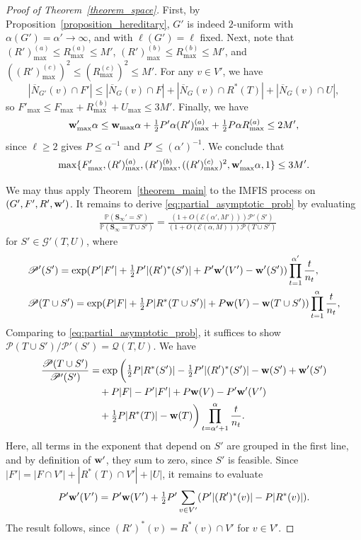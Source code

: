 \documentclass{article}
\theoremstyle{plain}
\theoremstyle{remark}
\theoremstyle{plain}
\numberwithin{equation}{section}
\renewcommand{\b}{{\bf{w}}}
\begin{document}
\begin{proof}[Proof of Theorem~\ref{theorem_space}]
		First, by Proposition~\ref{proposition_hereditary}, $G'$ is indeed $2$-uniform with $\alpha(G')=\alpha'\to\infty$, and with $\ell(G')=\ell$ fixed. Next, note that $(R')_{\max}^{(a)}\leq R_{\max}^{(a)}\leq M'$, $(R')_{\max}^{(b)}\leq R_{\max}^{(b)}\leq M'$, and $((R')_{\max}^{(c)})^2\leq(R_{\max}^{(c)})^2\leq M'$. For any $v\in V'$, we have $$|\overline{N}_{G'}(v)\cap F'|\leq|\overline{N}_G(v)\cap F|+|\overline{N}_G(v)\cap R^*(T)|+|\overline{N}_G(v)\cap U|,$$ so $F'_{\max}\leq F_{\max}+R_{\max}^{(b)}+U_{\max}\leq3M'$. Finally, we have $$\b'_{\max}\alpha\leq \b_{\max}\alpha+\tfrac12P'\alpha(R')_{\max}^{(a)}+\tfrac12P\alpha R_{\max}^{(a)}\leq2M',$$ since $\ell\geq2$ gives $P\leq\alpha^{-1}$ and $P'\leq(\alpha')^{-1}$. We conclude that $$\max\{F'_{\max},(R')_{\max}^{(a)},(R')_{\max}^{(b)},((R')_{\max}^{(c)})^2,\b'_{\max}\alpha,1\}\leq3M'.$$
		
		We may thus apply Theorem~\ref{theorem_main} to the IMFIS process on $(G',F',R',\b')$. It remains to derive \eqref{eq:partial_asymptotic_prob} by evaluating
		\begin{align}
			&\frac{\mathbb{P}(\boldsymbol{S}_{\infty}'=S')}{\mathbb{P}(\boldsymbol{S}_{\infty}=T\cup S')}=\frac{(1+O(\mathscr{E}(\alpha',M')))\mathscr{P}'(S')}{(1+O(\mathscr{E}(\alpha,M)))\mathscr{P}(T\cup S')}
		\end{align} 
		for $S'\in\mathcal{G}'(T,U)$, where
		\begin{align}
			&\mathscr{P}'(S')=\exp(P'|F'|+\tfrac12P'|(R')^*(S')|+P'\b'(V')-\b'(S'))\prod_{t=1}^{\alpha'}\frac{t}{n_t},
			\\&\mathscr{P}(T\cup S')=\exp(P|F|+\tfrac12P|R^*(T\cup S')|+P\b(V)-\b(T\cup S'))\prod_{t=1}^{\alpha}\frac{t}{n_t},
		\end{align}
		Comparing to \eqref{eq:partial_asymptotic_prob}, it suffices to show $\mathscr{P}(T\cup S')/\mathscr{P}'(S')=\mathscr{Q}(T,U)$. We have
		\begin{align}
			\frac{\mathscr{P}(T\cup S')}{\mathscr{P}'(S')}&=\exp\bigg(\tfrac12P|R^*(S')|-\tfrac12P'|(R')^*(S')|-\b(S')+\b'(S')\bigg.
			\\&\quad+P|F|-P'|F'|+P\b(V)-P'\b'(V')
			\\&\quad\bigg.+\tfrac12P|R^*(T)|-\b(T)\bigg)\prod_{t=\alpha'+1}^{\alpha}\frac{t}{n_t}.
		\end{align}
		Here, all terms in the exponent that depend on $S'$ are grouped in the first line, and by definition of $\b'$, they sum to zero, since $S'$ is feasible. Since $|F'|=|F\cap V'|+|R^*(T)\cap V'|+|U|$, it remains to evaluate $$P'\b'(V')=P'\b(V')+\tfrac12P'\sum_{v\in V'}(P'|(R')^*(v)|-P|R^*(v)|).$$ The result follows, since $(R')^*(v)=R^*(v)\cap V'$ for $v\in V'$.
	\end{proof}
	
\end{document}
